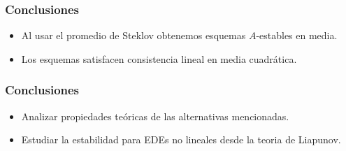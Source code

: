 \begin{frame}%
    \frametitle{Conclusiones}
		\begin{itemize}
			\item<+-> Al usar el promedio de Steklov obtenemos esquemas \alert{$A$-estables en media}.
			\item<+> Los esquemas satisfacen consistencia lineal en media cuadrática.	
		\end{itemize}
\end{frame}
\begin{frame}%
    \frametitle{Conclusiones}
		\begin{itemize}
			\item<+-> Analizar propiedades teóricas de las alternativas mencionadas.
			\item<+> Estudiar la estabilidad para EDEs no lineales desde la teoria de Liapunov.
		\end{itemize}
\end{frame}
